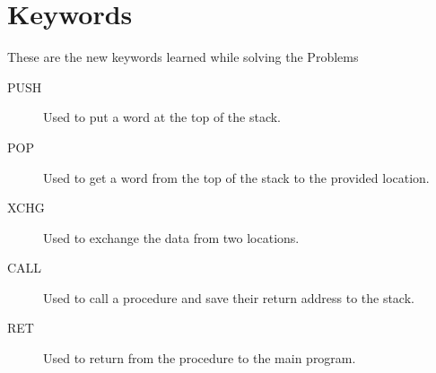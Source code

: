 \documentclass[12pt]{article}
\begin{document}





\pagebreak
\section*{Keywords}
These are the new keywords learned while solving the Problems
\begin{description}
    \item[PUSH] Used to put a word at the top of the stack.
    \item[POP] Used to get a word from the top of the stack to the provided location.
    \item[XCHG] Used to exchange the data from two locations.
    \item[CALL] Used to call a procedure and save their return address to the stack.
    \item[RET] Used to return from the procedure to the main program.
\end{description}
\end{document}
